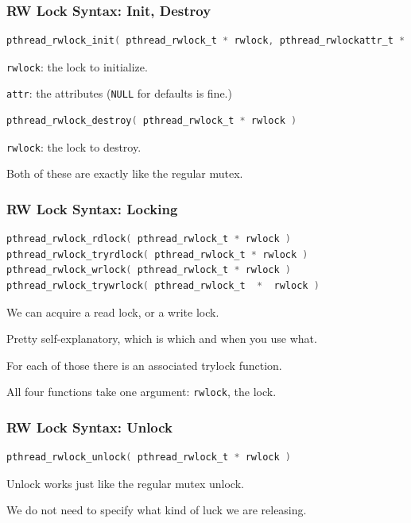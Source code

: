 \begin{frame}[fragile]
\frametitle{RW Lock Syntax: Init, Destroy}

\begin{lstlisting}[language=C]
pthread_rwlock_init( pthread_rwlock_t * rwlock, pthread_rwlockattr_t * attr )
\end{lstlisting}

\texttt{rwlock}: the lock to initialize.

\texttt{attr}: the attributes (\texttt{NULL} for defaults is fine.)


\begin{lstlisting}[language=C]
pthread_rwlock_destroy( pthread_rwlock_t * rwlock )
\end{lstlisting}

\texttt{rwlock}: the lock to destroy.


Both of these are exactly like the regular mutex.

\end{frame}

\begin{frame}[fragile]
\frametitle{RW Lock Syntax: Locking}

\begin{lstlisting}[language=C]
pthread_rwlock_rdlock( pthread_rwlock_t * rwlock )
pthread_rwlock_tryrdlock( pthread_rwlock_t * rwlock )
pthread_rwlock_wrlock( pthread_rwlock_t * rwlock )
pthread_rwlock_trywrlock( pthread_rwlock_t  *  rwlock )
\end{lstlisting}

We can acquire a read lock, or a write lock.

Pretty self-explanatory, which is which and when you use what.

For each of those there is an associated trylock function. 

All four functions take one argument: \texttt{rwlock}, the lock.


\end{frame}


\begin{frame}[fragile]
\frametitle{RW Lock Syntax: Unlock}

\begin{lstlisting}[language=C]
pthread_rwlock_unlock( pthread_rwlock_t * rwlock )
\end{lstlisting}

Unlock works just like the regular mutex unlock.

We do not need to specify what kind of luck we are releasing.

\end{frame}


